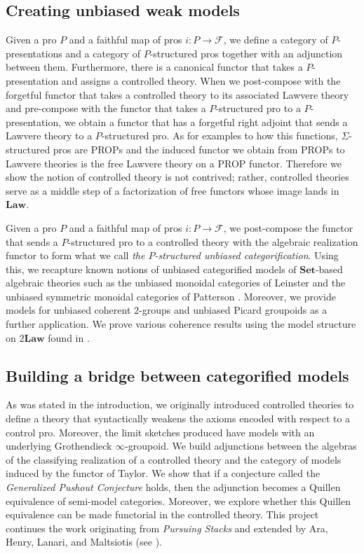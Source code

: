 \documentclass{tac}
\begin{document}
\subsection*{Creating unbiased weak models} Given a pro $P$ and a faithful map of pros $i:P\to\mathcal{F}$, we define a category of $P$-presentations and a category of $P$-structured pros together with an adjunction between them. Furthermore, there is a canonical functor that takes a $P$-presentation and assigns a controlled theory. When we post-compose with the forgetful functor that takes a controlled theory to its associated Lawvere theory and pre-compose with the functor that takes a $P$-structured pro to a $P$-presentation, we obtain a functor that has a forgetful right adjoint that sends a Lawvere theory to a $P$-structured pro. As for examples to how this functions, $\Sigma$-structured pros are PROPs and the induced functor we obtain from PROPs to Lawvere theories is the free Lawvere theory on a PROP functor. Therefore we show the notion of controlled theory is not contrived; rather, controlled theories serve as a middle step of a factorization of free functors whose image lands in $\mathbf{Law}$.

Given a pro $P$ and a faithful map of pros $i:P\to\mathcal{F}$, we post-compose the functor that sends a $P$-structured pro to a controlled theory with the algebraic realization functor to form what we call \emph{the $P$-structured unbiased categorification}. Using this, we recapture known notions of unbiased categorified models of $\mathbf{Set}$-based algebraic theories such as the unbiased monoidal categories of Leinster \cite{Lein} and the unbiased symmetric monoidal categories of Patterson \cite{Patt1}. Moreover, we provide models for unbiased coherent $2$-groups and unbiased Picard groupoids as a further application. We prove various coherence results using the model structure on $2\mathbf{Law}$ found in \cite{yan1}.

\subsection*{Building a bridge between categorified models}
As was stated in the introduction, we originally introduced controlled theories to define a theory that syntactically weakens the axioms encoded with respect to a control pro. Moreover, the limit sketches produced have models with an underlying Grothendieck $\infty$-groupoid. We build adjunctions between the algebras of the classifying realization of a controlled theory and the category of models induced by the functor of Taylor. We show that if a conjecture called the \emph{Generalized Pushout Conjecture} holds, then the adjunction becomes a Quillen equivalence of semi-model categories. Moreover, we explore whether this Quillen equivalence can be made functorial in the controlled theory. This project continues the work originating from \emph{Pursuing Stacks} \cite{Gr1} and extended by Ara, Henry, Lanari, and Maltsiotis (see \cite{Dim1,HenLan,LanE,Geo2}).
\end{document}
